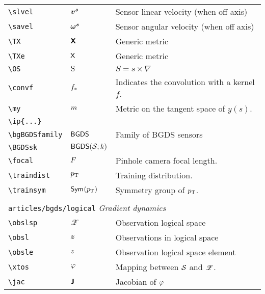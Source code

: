 \begin{longtable}{lll}
 {\color[rgb]{0.5,0.5,0.5}\texttt{\textbackslash slvel}} & $\boldsymbol{v^s}$ &  Sensor linear velocity (when off axis)\\ 
 {\color[rgb]{0.5,0.5,0.5}\texttt{\textbackslash savel}} & $\boldsymbol{\omega^s}$ &  Sensor angular velocity (when off axis)\\ 
 {\color[rgb]{0.5,0.5,0.5}\texttt{\textbackslash TX}} & $\boldsymbol{{\mathsf{X}}}$ &  Generic metric\\ 
 {\color[rgb]{0.5,0.5,0.5}\texttt{\textbackslash TXe}} & ${\mathsf{X}}$ &  Generic metric\\ 
 {\color[rgb]{0.5,0.5,0.5}\texttt{\textbackslash OS}} & $\mathrm{S}$ &  $S = s\times \nabla$\\ 
 {\color[rgb]{0.5,0.5,0.5}\texttt{\textbackslash convf}} & $f_\ast$ &  Indicates the convolution with a kernel $f$.\\ 
 {\color[rgb]{0.5,0.5,0.5}\texttt{\textbackslash my}} & $m$ &  Metric on the tangent space of $y(s)$.\\ 
 {\color[rgb]{0.5,0.5,0.5}\texttt{\textbackslash ip\{...\}}} &  & \\ 
 {\color[rgb]{0.5,0.5,0.5}\texttt{\textbackslash bgBGDSfamily}} & $\mathsf{BGDS}$ &  Family of BGDS sensors\\ 
 {\color[rgb]{0.5,0.5,0.5}\texttt{\textbackslash BGDSsk}} & $\BGDSsk$ & \\ 
 {\color[rgb]{0.5,0.5,0.5}\texttt{\textbackslash focal}} & $F$ &  Pinhole camera focal length.\\ 
 {\color[rgb]{0.5,0.5,0.5}\texttt{\textbackslash traindist}} & $p_\text{T}$ &  Training distribution.\\ 
 {\color[rgb]{0.5,0.5,0.5}\texttt{\textbackslash trainsym}} & ${\mathsf{Sym}^{}(p_\text{T})}$ &  Symmetry group of $p_\text{T}$.\\ 
  &  & \\ 
 \multicolumn{3}{l}{{\color[rgb]{0.5,0.5,0.5}\texttt{articles/bgds/logical}} \emph{Gradient dynamics}}\\ 
 \hline
{\color[rgb]{0.5,0.5,0.5}\texttt{\textbackslash obslsp}} & $\mathscr{Z}$ &  Observation logical space\\ 
 {\color[rgb]{0.5,0.5,0.5}\texttt{\textbackslash obsl}} & $\boldsymbol{z}$ &  Observations in logical space\\ 
 {\color[rgb]{0.5,0.5,0.5}\texttt{\textbackslash obsle}} & $z$ &  Observation logical space element\\ 
 {\color[rgb]{0.5,0.5,0.5}\texttt{\textbackslash xtos}} & $\varphi$ &  Mapping between $\obsps$ and $\mathscr{Z}$.\\ 
 {\color[rgb]{0.5,0.5,0.5}\texttt{\textbackslash jac}} & $\boldsymbol{{\mathsf{J}}}$ &  Jacobian of $\varphi$\\ 

\end{longtable}
